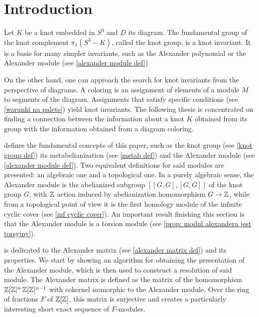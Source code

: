 \section*{Introduction}

Let $K$ be a knot embedded in $S^3$ and $D$ its diagram. The fundamental group of the knot complement $\pi_1(S^3-K)$, called the knot group, is a knot invariant. It is a basis for many simpler invariants, such as the Alexander polynomial \cite{alex-oryginal} or the Alexander module (see \cref{alexander module def}) 

On the other hand, one can approach the search for knot invariants from the perspective of diagrams. A coloring is an assignment of elements of a module $M$ to segments of the diagram. 
Assignments that satisfy specific conditions (see \cref{warunki na palete}) yield knot invariants. 
The following thesis is concentrated on finding a connection between the information about a knot $K$ obtained from its group with the information obtained from a diagram coloring.

 defines the fundamental concepts of this paper, such as the knot group (see \cref{knot group def}) its metabelianization (see \cref{metab def}) and the Alexander module (see \cref{alexander module def}). Two equivalent definitions for said modules are presented: an algebraic one and a topological one. In a purely algebraic sense, the Alexander module is the abelianized subgroup $[[G, G], [G, G]]$ of the knot group $G$, with $\operatorname{\mathbb{Z}}$ action induced by abelianization homomorphism $G\to \operatorname{\mathbb{Z}}$, while from a topological point of view it is the first homology module of the infinite cyclic cover (see \cref{inf cyclic cover}). An important result finishing this section is that the Alexander module is a torsion module (see \cref{prop: modul alexandera jest torsyjny}).

 is dedicated to the Alexander matrix (see \cref{alexander matrix def}) and its properties. We start by showing an algorithm for obtaining the presentation of the Alexander module, which is then used to construct a resolution of said module. The Alexander matrix is defined as the matrix of the homomorphism $\operatorname{\mathbb{Z}}[\operatorname{\mathbb{Z}}]^n\operatorname{\mathbb{Z}}[\operatorname{\mathbb{Z}}]^{n-1}$ with cokernel isomorphic to the Alexander module.
Over the ring of fractions $F$ \cite[Cahpter~2]{atiyah} of $\operatorname{\mathbb{Z}}[\operatorname{\mathbb{Z}}]$, this matrix is surjective and creates a particularly interesting short exact sequence of $F$-modules.

